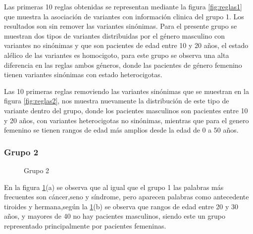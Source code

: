 Las primeras 10 reglas obtenidas se representan mediante la figura \ref{fig:reglas1} que muestra la asociación de variantes con información clinica del grupo 1. Los resultados son sin remover las variantes sinónimas. Para el presente grupo se muestran dos tipos de variantes  distribuidas por el género masculino con variantes no sinónimas y que son pacientes de edad entre 10 y 20 años, el estado alélico de las variantes es homocigoto, para este grupo se observa una alta diferencia en las reglas ambos géneros, donde las pacientes de género femenino tienen variantes sinónimas con estado heterocigotas.



Las 10 primeras reglas removiendo las variantes sinónimas que se muestran en la figura  \ref{fig:reglas2}, nos muestra nuevamente la distribución de este tipo de variante dentro del grupo, donde los pacientes masculinos son pacientes entre 10 y 20 años, con variantes heterocigotas no sinónimas, mientras que para el genero femenino se tienen rangos de edad más amplios desde la edad  de 0 a 50 años.

\subsubsection*{Grupo 2}

\begin{figure}[H]
	\centering
	\caption{Grupo 2} \label{fig:c2}
\end{figure}

En la figura \ref{fig:c2}(a) se observa que al igual que el grupo 1 las palabras más frecuentes son cáncer,seno y síndrome, pero aparecen palabras como antecedente tiroides y hermana,según la \ref{fig:c2}(b) se observa que rangos de edad entre 20 y 30 años, y mayores de 40 no hay pacientes masculinos, siendo este un grupo representado principalmente por pacientes femeninas.  

